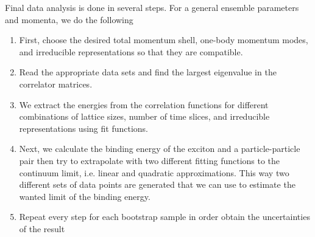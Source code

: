 

Final data analysis is done in several steps. For a general ensemble parameters and momenta, we do the following
\begin{enumerate}
  \item First, choose the desired total momentum shell, one-body momentum modes, and irreducible representations so that they are compatible.
  \item Read the appropriate data sets and find the largest eigenvalue in the correlator matrices.
  \item We extract the energies from the correlation functions for different combinations of lattice sizes, number of time slices, and irreducible representations using fit functions.
  \item Next, we calculate the binding energy of the exciton and a particle-particle pair then try to extrapolate with two different fitting functions to the continuum limit, i.e. linear and quadratic approximations. This way two different sets of data points are generated that we can use to estimate the wanted limit of the binding energy.
  \item Repeat every step for each bootstrap sample in order obtain the uncertainties of the result
\end{enumerate}

